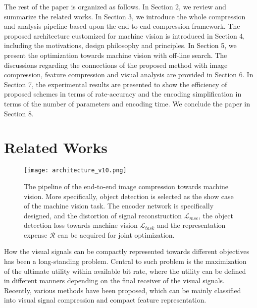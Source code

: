 \documentclass[transmag]{IEEEtran}
\begin{document}
The rest of the paper is organized as follows. In Section 2, we review and summarize the related works. In Section 3, we introduce the whole compression and analysis pipeline based upon the end-to-end compression framework. 
The proposed architecture customized for machine vision is introduced in Section 4, including the motivations, design philosophy and principles. In Section 5, we present the optimization towards machine vision with off-line search. The discussions {regarding the connections} of the proposed method with image compression, feature compression and visual analysis are provided in Section 6. 
In Section 7, the experimental results are presented to show the efficiency of proposed schemes in terms of rate-accuracy and the encoding simplification in terms of the number of parameters and encoding time. We conclude the paper in Section 8.

\section{Related Works}
\begin{figure*}[htbp]
\centerline{\texttt{[image: architecture\_v10.png]}}
\vspace{-2mm}
\caption{The pipeline of the end-to-end image compression towards machine vision. More specifically, object detection is selected as the show case of the machine vision task. The encoder network is specifically designed, and the distortion of signal reconstruction $\mathcal{L}_{mse}$, the object detection loss towards machine vision $\mathcal{L}_{task}$ and the representation expense $\mathcal R$ can be acquired for joint optimization.}
\label{architecture}
\vspace{-4mm}
\end{figure*}
How the visual signals can be compactly represented towards different objectives has been a long-standing problem. Central to such problem is the maximization of the ultimate utility within available bit rate, where the utility can be defined in different manners depending on the final receiver of the visual signals. 
Recently, various methods have been proposed, which can be mainly classified into visual signal compression and compact feature representation. 
\end{document}
